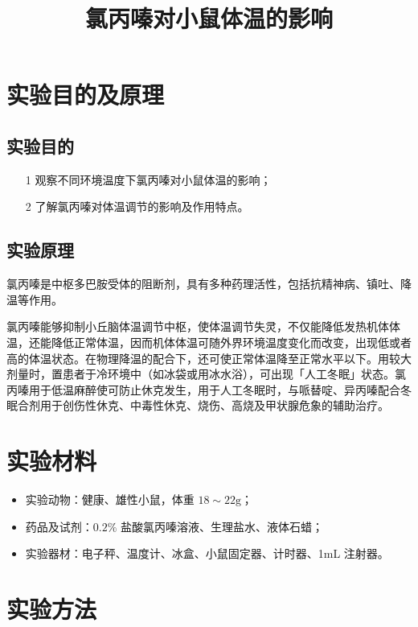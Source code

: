 \documentclass[UTF8]{ctexart}
\title{氯丙嗪对小鼠体温的影响}
\author{}
\begin{document}
\date{}
\maketitle

\section{实验目的及原理}

\subsection{实验目的}

\begin{itemize}
    \item [1] 观察不同环境温度下氯丙嗪对小鼠体温的影响；
    \item [2] 了解氯丙嗪对体温调节的影响及作用特点。
\end{itemize}

\subsection{实验原理}

氯丙嗪是中枢多巴胺受体的阻断剂，具有多种药理活性，包括抗精神病、镇吐、降温等作用。

氯丙嗪能够抑制小丘脑体温调节中枢，使体温调节失灵，不仅能降低发热机体体温，还能降低正常体温，因而机体体温可随外界环境温度变化而改变，出现低或者高的体温状态。在物理降温的配合下，还可使正常体温降至正常水平以下。用较大剂量时，置患者于冷环境中（如冰袋或用冰水浴），可出现「人工冬眠」状态。氯丙嗪用于低温麻醉使可防止休克发生，用于人工冬眠时，与哌替啶、异丙嗪配合冬眠合剂用于创伤性休克、中毒性休克、烧伤、高烧及甲状腺危象的辅助治疗。

\section{实验材料}

\begin{itemize}
    \item 实验动物：健康、雄性小鼠，体重 $18\sim 22\text{g}$；
    \item 药品及试剂：$0.2\%$ 盐酸氯丙嗪溶液、生理盐水、液体石蜡；
    \item 实验器材：电子秤、温度计、冰盒、小鼠固定器、计时器、1mL 注射器。
\end{itemize}

\section{实验方法}
\end{document}
